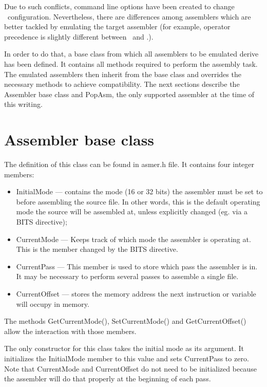 \documentclass[a4paper,draft,12pt]{book}
\begin{document}
Due to such conflicts, command line options have been created to change
\popasm\ configuration. Nevertheless, there are differences among
assemblers which are better tackled by emulating the target assembler
(for example, operator precedence is slightly different between \popasm\ 
and \nasm.).

In order to do that, a base class from which all assemblers to be emulated
derive has been defined. It contains all methods required to perform
the assembly task. The emulated assemblers then inherit from the base
class and overrides the necessary methods to achieve compatibility.
The next sections describe the Assembler base class and PopAsm, the
only supported assembler at the time of this writing.

\section{Assembler base class}
The definition of this class can be found in asmer.h file. It contains four
integer members:

\begin{itemize}
\item InitialMode --- contains the mode (16 or 32 bits) the assembler must
be set to before assembling the source file. In other words, this is the
default operating mode the source will be assembled at, unless explicitly
changed (eg. via a BITS directive);

\item CurrentMode --- Keeps track of which mode the assembler is operating
at. This is the member changed by the BITS directive.

\item CurrentPass --- This member is used to store which pass the assembler
is in. It may be necessary to perform several passes to assemble a single file.

\item CurrentOffset --- stores the memory address the next instruction or
variable will occupy in memory.
\end{itemize}

The methods GetCurrentMode(), SetCurrentMode() and GetCurrentOffset() allow
the interaction with those members.

The only constructor for this class takes the initial mode as its argument.
It initializes the InitialMode member to this value and sets CurrentPass
to zero. Note that CurrentMode and CurrentOffset do not need to be
initialized because the assembler will do that properly at the beginning of
each pass.
\end{document}

